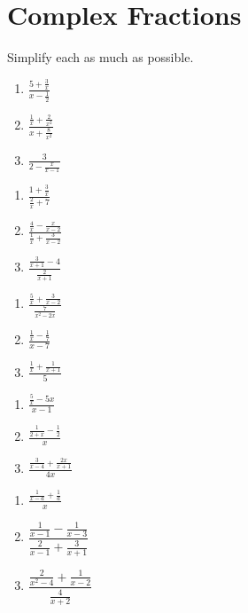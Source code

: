 \chapter{Complex Fractions}

Simplify each as much as possible.

\begin{multicols}{3}
\begin{enumerate}
\item $\frac{5+\frac{3}{x}}{x-\frac{1}{2}}$
\item $\frac{\frac{1}{x}+\frac{2}{x^2}}{x+\frac{8}{x^2}}$
\item $\frac{3}{2-\frac{x}{x-1}}$
\end{enumerate}	\setcounter{Review}{\value{enumi}}
\end{multicols}
\smallskip
\begin{multicols}{3}
\begin{enumerate}	\setcounter{enumi}{\value{Review}}
\item $\frac{1+\frac{3}{x}}{\frac{2}{x}+7}$
\item $\frac{\frac{4}{x}-\frac{x}{x-2}}{\frac{1}{x}+{\frac{3}{x-2}}}$
\item $\frac{\frac{3}{x+1}-4}{\frac{2}{x+1}}$
\end{enumerate}	\setcounter{Review}{\value{enumi}}
\end{multicols}
\smallskip
\begin{multicols}{3}
\begin{enumerate}	\setcounter{enumi}{\value{Review}}
\item $\frac{\frac{5}{x}+\frac{3}{x-2}}{\frac{7}{x^2-2x}}$
\item $\frac{\frac{1}{x}-\frac{1}{7}}{x-7}$
\item $\frac{\frac{1}{x}+\frac{1}{x+1}}{5}$
\end{enumerate}	\setcounter{Review}{\value{enumi}}
\end{multicols}
\smallskip
\begin{multicols}{3}
\begin{enumerate}	\setcounter{enumi}{\value{Review}}
\item $\frac{\frac{5}{x}-5x}{x-1}$
\item $\frac{\frac{1}{2+x}-\frac{1}{2}}{x}$
\item $\frac{\frac{3}{x-4}+\frac{2x}{x+1}}{4x}$
\end{enumerate}	\setcounter{Review}{\value{enumi}}
\end{multicols}
\smallskip
\begin{multicols}{3}
\begin{enumerate}	\setcounter{enumi}{\value{Review}}
\item $\frac{\frac{1}{x-a}+\frac{1}{a}}{x}$
\item $\dfrac{\frac{1}{x-1}-\frac{1}{x-3}}{\frac{2}{x-1}+\frac{3}{x+1}}$
\item $\dfrac{\frac{2}{x^2-4}+\frac{1}{x-2}}{\frac{4}{x+2}}$
\end{enumerate}
\end{multicols}

